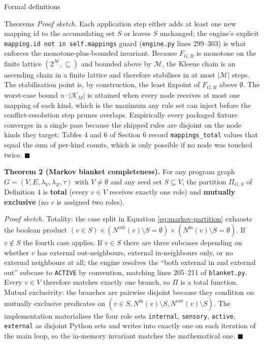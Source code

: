 \documentclass[
  ignorenonframetext,
]{beamer}
\begin{document}
\begin{frame}[fragile]{Formal definitions}
\begin{block}{Theorems}
\emph{Proof sketch.} Each application step either adds at least one new
mapping id to the accumulating set \(S\) or leaves \(S\) unchanged; the
engine's explicit \texttt{mapping.id\ not\ in\ self.mappings} guard
(\texttt{engine.py} lines 299--303) is what enforces the
monotone-plus-bounded invariant. Because \(F_{G,R}\) is monotone on the
finite lattice \((2^{\mathcal{M}}, \subseteq)\) and bounded above by
\(\mathcal{M}\), the Kleene chain is an ascending chain in a finite
lattice and therefore stabilises in at most \(|\mathcal{M}|\) steps. The
stabilisation point is, by construction, the least fixpoint of
\(F_{G,R}\) above \(\emptyset\). The worst-case bound
\(n \cdot |\mathcal{K}_M|\) is attained when every node receives at most
one mapping of each kind, which is the maximum any rule set can inject
before the conflict-resolution step prunes overlaps. Empirically every
packaged fixture converges in a single pass because the shipped rules
are disjoint on the node kinds they target: Tables 4 and 6 of Section 6
record \texttt{mappings\_total} values that equal the sum of per-kind
counts, which is only possible if no node was touched twice.
\(\blacksquare\)

\textbf{Theorem 2 (Markov blanket completeness).} For any program graph
\(G = (V, E, \lambda_V, \lambda_E, \tau)\) with \(V \neq \emptyset\) and
any seed set \(S \subseteq V\), the partition \(\Pi_{G, S}\) of
Definition 4 is \textbf{total} (every \(v \in V\) receives exactly one
role) and \textbf{mutually exclusive} (no \(v\) is assigned two roles).

\emph{Proof sketch.} Totality: the case split in Equation
\ref{eq:markov-partition} exhausts the boolean product
\((v \in S) \times (N^{\text{out}}(v) \setminus S = \emptyset) \times (N^{\text{in}}(v) \setminus S = \emptyset)\).
If \(v \notin S\) the fourth case applies. If \(v \in S\) there are
three subcases depending on whether \(v\) has external out-neighbours,
external in-neighbours only, or no external neighbours at all; the
engine resolves the ``both external in and external out'' subcase to
\texttt{ACTIVE} by convention, matching lines 205--211 of
\texttt{blanket.py}. Every \(v \in V\) therefore matches exactly one
branch, so \(\Pi\) is a total function. Mutual exclusivity: the branches
are pairwise disjoint because they condition on mutually exclusive
predicates on
\((v \in S, N^{\text{in}}(v) \setminus S, N^{\text{out}}(v) \setminus S)\).
The implementation materialises the four role sets \texttt{internal},
\texttt{sensory}, \texttt{active}, \texttt{external} as disjoint Python
sets and writes into exactly one on each iteration of the main loop, so
the in-memory invariant matches the mathematical one. \(\blacksquare\)


\end{block}
\end{frame}
\end{document}
